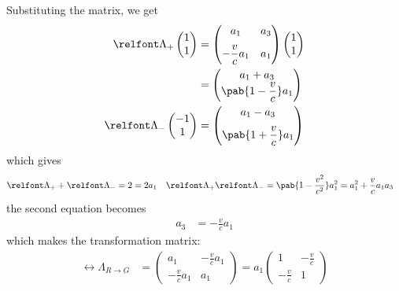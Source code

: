 Substituting the matrix, we get
\begin{align}
  \rel{\Lambda}_+ \begin{pmatrix}
                    1 \\
                    1
                  \end{pmatrix} & = \begin{pmatrix}
                                      a_1                & a_3 \\[6pt]
                                      - \dfrac{v}{c} a_1 & a_1
                                    \end{pmatrix} \begin{pmatrix}
                                                    1 \\
                                                    1
                                                  \end{pmatrix}       \\
                                  & = \begin{pmatrix}
                                        a_1 + a_3 \\
                                        \pab{1 - \dfrac{v}{c}} a_1
                                      \end{pmatrix} \\
  \rel{\Lambda}_- \begin{pmatrix}
                    -1 \\
                    1
                  \end{pmatrix} & = \begin{pmatrix}
                                      a_1 - a_3 \\[6pt]
                                      \pab{1 + \dfrac{v}{c}} a_1
                                    \end{pmatrix}
\end{align}
which gives
\begin{align}
  \rel{\Lambda}_+ + \rel{\Lambda}_- & = 2  = 2 a_1 \quad  \rel{\Lambda}_+ \rel{\Lambda}_-   = \pab{1 - \dfrac{v^2}{c^2}} a_1^2 = a_1^2 + \frac{v}{c} a_1 a_3
\end{align}
the second equation becomes
\begin{align}
  a_3 & = - \frac{v}{c} a_1
\end{align}
which makes the transformation matrix:
\begin{align}
  \rel{\Lambda}_{R \to G} & = \begin{pmatrix}
                                a_1              & -\frac{v}{c} a_1 \\[6pt]
                                -\frac{v}{c} a_1 & a_1
                              \end{pmatrix} = a_1 \begin{pmatrix}
                                                    1            & -\frac{v}{c} \\[6pt]
                                                    -\frac{v}{c} & 1
                                                  \end{pmatrix}
\end{align}
